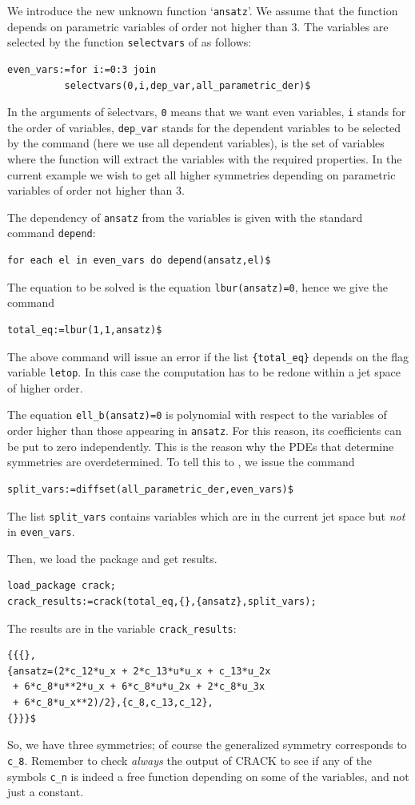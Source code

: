 We introduce the new unknown function `\texttt{ansatz}'. We assume that the
function depends on parametric variables of order not higher than $3$.  The
variables are selected by the function \texttt{selectvars} of \cde as follows:
\begin{verbatim}
even_vars:=for i:=0:3 join
          selectvars(0,i,dep_var,all_parametric_der)$
\end{verbatim}
In the arguments of \f{selectvars}, \texttt{0} means that we want even
variables, \texttt{i} stands for the order of variables, \texttt{dep\_var}
stands for the dependent variables to be selected by the command (here we use
all dependent variables),  is the set of variables
where the function will extract the variables with the required properties.
In the current example we wish to get all higher symmetries depending on
parametric variables of order not higher than $3$.

The dependency of \texttt{ansatz} from the variables is given with the standard
\REDUCE command \texttt{depend}:
\begin{verbatim}
for each el in even_vars do depend(ansatz,el)$
\end{verbatim}
The equation to be solved is the equation \texttt{lbur(ansatz)=0}, hence we
give the command
\begin{verbatim}
total_eq:=lbur(1,1,ansatz)$
\end{verbatim}
The above command will issue an error if the list \texttt{\{total\_eq\}}
depends on the flag variable \texttt{letop}. In this case the computation has
to be redone within a jet space of higher order.

The equation \texttt{ell\_b(ansatz)=0} is polynomial with respect to the
variables of order higher than those appearing in \texttt{ansatz}. For this
reason, its coefficients can be put to zero independently. This is the reason
why the PDEs that determine symmetries are overdetermined. To tell this to
\crack, we issue the command
\begin{verbatim}
split_vars:=diffset(all_parametric_der,even_vars)$
\end{verbatim}
The list \texttt{split\_vars} contains variables which are in the current
\cde jet space but \emph{not} in \texttt{even\_vars}.

Then, we load the package \crack and get results.
\begin{verbatim}
load_package crack;
crack_results:=crack(total_eq,{},{ansatz},split_vars);
\end{verbatim}
The results are in the variable \texttt{crack\_results}:
\begin{verbatim}
{{{},
{ansatz=(2*c_12*u_x + 2*c_13*u*u_x + c_13*u_2x
 + 6*c_8*u**2*u_x + 6*c_8*u*u_2x + 2*c_8*u_3x
 + 6*c_8*u_x**2)/2},{c_8,c_13,c_12},
{}}}$
\end{verbatim}
So, we have three symmetries; of course the generalized symmetry corresponds to
\texttt{c\_8}. Remember to check \emph{always} the output of CRACK to see if
any of the symbols \texttt{c\_n} is indeed a free function depending on some of
the variables, and not just a constant.


